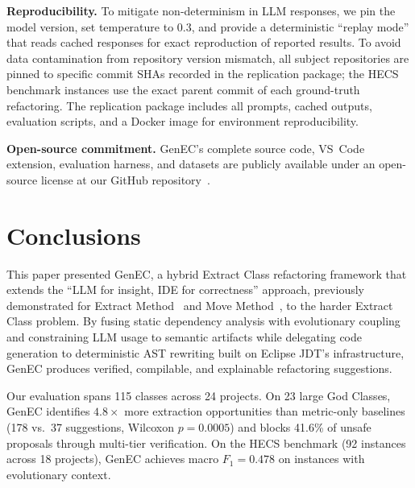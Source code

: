 \documentclass[sigconf]{acmart}
\begin{document}
\textbf{Reproducibility.}  To mitigate non-determinism in LLM responses, we pin
the model version, set temperature to 0.3, and provide a deterministic ``replay
mode'' that reads cached responses for exact reproduction of reported results.
To avoid data contamination from repository version mismatch, all subject
repositories are pinned to specific commit SHAs recorded in the replication
package; the HECS benchmark instances use the exact parent commit of each
ground-truth refactoring.
The replication package includes all prompts, cached outputs, evaluation scripts,
and a Docker image for environment reproducibility.

\textbf{Open-source commitment.}  GenEC's complete source code, VS~Code
extension, evaluation harness, and datasets are publicly available under an
open-source license at our GitHub
repository~\cite{Tomar2025GenEC}.

\section{Conclusions}
\label{sec:conclusions}

This paper presented GenEC, a hybrid Extract Class refactoring framework that
extends the ``LLM for insight, IDE for correctness''
approach, previously demonstrated for Extract
Method~\cite{Pomian2024EMAssist} and Move
Method~\cite{Xu2025MoveMethod}, to the harder Extract Class problem. By
fusing static dependency analysis with evolutionary coupling and constraining
LLM usage to semantic artifacts while delegating code generation to deterministic
AST rewriting built on Eclipse JDT's infrastructure, GenEC produces verified,
compilable, and explainable refactoring suggestions.

Our evaluation spans 115 classes across 24 projects. On 23 large God Classes,
GenEC identifies $4.8\times$ more extraction opportunities than metric-only
baselines (178 vs.\ 37 suggestions, Wilcoxon $p{=}0.0005$) and blocks 41.6\%
of unsafe proposals through multi-tier verification. On the HECS benchmark (92
instances across 18 projects), GenEC achieves macro $F_1{=}0.478$ on instances
with evolutionary context.
\end{document}
